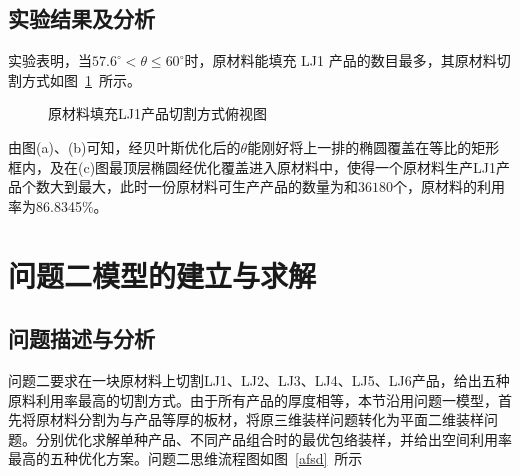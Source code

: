 \documentclass{whutmod}
\begin{document}
        \subsection{实验结果及分析}
        实验表明，当$ 57.6^{\circ}< \theta \leqslant  60^{\circ}$时，原材料能填充 LJ1 产品的数目最多，其原材料切割方式如图~\ref{ccsdc}~所示。
        \begin{figure}[H]
        	\centering
		\caption{原材料填充LJ1产品切割方式俯视图}\label{ccsdc}
        \end{figure}
    
    由图(a)、(b)可知，经贝叶斯优化后的$\theta$能刚好将上一排的椭圆覆盖在等比的矩形框内，及在(c)图最顶层椭圆经优化覆盖进入原材料中，使得一个原材料生产LJ1产品个数大到最大，此时一份原材料可生产产品的数量为和$36180$个，原材料的利用率为86.8345\%。

	\section{问题二模型的建立与求解}
		\subsection{问题描述与分析}
			问题二要求在一块原材料上切割LJ1、LJ2、LJ3、LJ4、LJ5、LJ6产品，给出五种原料利用率最高的切割方式。由于所有产品的厚度相等，本节沿用问题一模型，首先将原材料分割为与产品等厚的板材，将原三维装样问题转化为平面二维装样问题。分别优化求解单种产品、不同产品组合时的最优包络装样，并给出空间利用率最高的五种优化方案。问题二思维流程图如图~\ref{afsd}~所示
			
\end{document}

